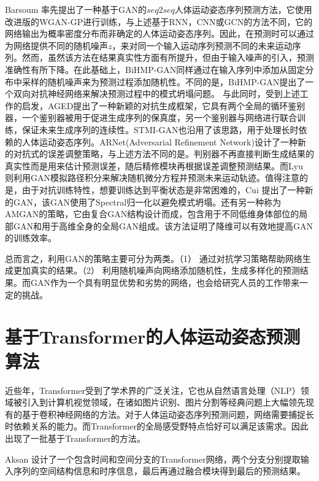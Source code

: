 Barsoum \etal \parencite{barsoum2018hp}率先提出了一种基于GAN的$seq2seq$人体运动姿态序列预测方法，它使用改进版的WGAN-GP进行训练，与上述基于RNN，CNN或GCN的方法不同，它的网络输出为概率密度分布而非确定的人体运动姿态序列。因此，在预测时可以通过为网络提供不同的随机噪声$z$，来对同一个输入运动序列预测不同的未来运动序列。然而，虽然该方法在结果真实性方面有所提升，但由于输入噪声的引入，预测准确性有所下降。在此基础上，BiHMP-GAN\parencite{kundu2019bihmp}同样通过在输入序列中添加从固定分布中采样的随机噪声来为预测过程添加随机性。不同的是，BiHMP-GAN提出了一个双向对抗神经网络来解决预测过程中的模式坍塌问题。
与此同时，受到上述工作的启发，AGED\parencite{gui2018adversarial}提出了一种新颖的对抗生成框架，它具有两个全局的循环鉴别器，一个鉴别器被用于促进生成序列的保真度，另一个鉴别器与网络进行联合训练，保证未来生成序列的连续性。STMI-GAN\parencite{hernandez2019human}也沿用了该思路，用于处理长时依赖的人体运动姿态序列。ARNet(Adversarial Refinement Network)\parencite{chao2020adversarial}设计了一种新的对抗式的误差调整策略，与上述方法不同的是。判别器不再直接判断生成结果的真实性而是用来估计预测误差，随后精修模块再根据误差调整预测结果。而Lyu \etal \parencite{lyu2021learning}则利用GAN模拟路径积分来解决随机微分方程并预测未来运动轨迹。值得注意的是，由于对抗训练特性，想要训练达到平衡状态是非常困难的，Cui \etal\parencite{cui2021efficient}提出了一种新的GAN，该GAN使用了Spectral归一化以避免模式坍塌。还有另一种称为AMGAN\parencite{liu2021aggregated}的策略，它由复合GAN结构设计而成，包含用于不同低维身体部位的局部GAN和用于高维全身的全局GAN组成。该方法证明了降维可以有效地提高GAN的训练效率。

总而言之，利用GAN的策略主要可分为两类。（1） 通过对抗学习策略帮助网络生成更加真实的结果。（2） 利用随机噪声向网络添加随机性，生成多样化的预测结果。而GAN作为一个具有明显优势和劣势的网络，也会给研究人员的工作带来一定的挑战。

\section{基于Transformer的人体运动姿态预测算法}
近些年，Transformer受到了学术界的广泛关注，它也从自然语言处理（NLP）领域被引入到计算机视觉领域，在诸如图片识别、图片分割等经典问题上大幅领先现有的基于卷积神经网络的方法。对于人体运动姿态序列预测问题，网络需要捕捉长时依赖关系的能力。而Transformer的全局感受野特点恰好可以满足该需求。因此出现了一批基于Transformer的方法\parencite{aksan2021spatio, cai2020learning}。

Aksan \etal \parencite{aksan2021spatio}设计了一个包含时间和空间分支的Transformer网络，两个分支分别提取输入序列的空间结构信息和时序信息，最后再通过融合模块得到最后的预测结果。

